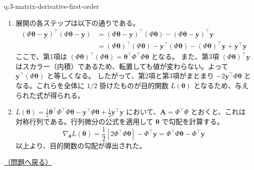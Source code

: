 \documentclass[
  pandoc]{bxjsarticle}
\begin{document}
\begin{answerbox}[phantomlabel=a:3-matrix-derivative-first-order]{q:3-matrix-derivative-first-order}

\begin{enumerate}
\def\labelenumi{\arabic{enumi}.}
\item
  展開の各ステップは以下の通りである。 \begin{align*}
  (\Phi\boldsymbol{\theta} - \mathbf{y})^\top (\Phi\boldsymbol{\theta} - \mathbf{y})
  &= (\Phi\boldsymbol{\theta} - \mathbf{y})^\top (\Phi\boldsymbol{\theta}) - (\Phi\boldsymbol{\theta} - \mathbf{y})^\top \mathbf{y} \\
  &= (\Phi\boldsymbol{\theta})^\top (\Phi\boldsymbol{\theta}) - \mathbf{y}^\top (\Phi\boldsymbol{\theta}) - (\Phi\boldsymbol{\theta})^\top \mathbf{y} + \mathbf{y}^\top \mathbf{y}
  \end{align*} ここで、第1項は
  \((\Phi\boldsymbol{\theta})^\top (\Phi\boldsymbol{\theta}) = \boldsymbol{\theta}^\top \Phi^\top \Phi \boldsymbol{\theta}\)
  となる。 また、第3項 \((\Phi\boldsymbol{\theta})^\top \mathbf{y}\)
  はスカラー（内積）であるため、転置しても値が変わらない。よって
  \(\mathbf{y}^\top (\Phi\boldsymbol{\theta})\) と等しくなる。
  したがって、第2項と第3項がまとまり
  \(-2\mathbf{y}^\top \Phi \boldsymbol{\theta}\) となる。これらを全体に
  \(1/2\) 掛けたものが目的関数 \(L(\boldsymbol{\theta})\)
  となるため、与えられた式が得られる。
\item
  \(L(\boldsymbol{\theta}) = \frac{1}{2}\boldsymbol{\theta}^\top \Phi^\top \Phi \boldsymbol{\theta} - \mathbf{y}^\top \Phi \boldsymbol{\theta} + \frac{1}{2}\mathbf{y}^\top \mathbf{y}\)
  において、\(\mathbf{A} = \Phi^\top \Phi\)
  とおくと、これは対称行列である。行列微分の公式を適用して
  \(\boldsymbol{\theta}\) で勾配を計算する。 \[
  \nabla_{\boldsymbol{\theta}} L(\boldsymbol{\theta}) = \frac{1}{2} \left[ 2 \Phi^\top \Phi \boldsymbol{\theta} \right] - \Phi^\top \mathbf{y} = \Phi^\top \Phi \boldsymbol{\theta} - \Phi^\top \mathbf{y}
  \] 以上より、目的関数の勾配が導出された。
\end{enumerate}

\hfill 

\hyperref[q:3-matrix-derivative-first-order]{（問題へ戻る）}

\end{answerbox}
\end{document}

